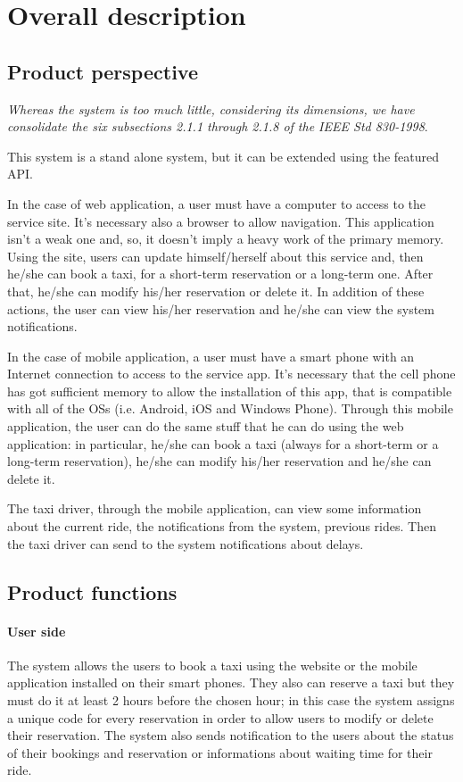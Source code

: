 \section{Overall description}
	\subsection{Product perspective}
		\emph{Whereas the system is too much little, considering its dimensions, we have consolidate the six subsections 2.1.1 through 2.1.8 of the IEEE Std 830-1998}.
		\vspace{10pt}
		
		This system is a stand alone system, but it can be extended using the featured API.
		
		In the case of web application, a user must have a computer to access to the service site. It's necessary also a browser to allow navigation. This application isn't a weak one and, so, it doesn't imply a heavy work of the primary memory. 
		Using the site, users can update himself/herself about this service and, then he/she can book a taxi, for a short-term reservation or a long-term one. After that, he/she can modify his/her reservation or delete it. In addition of these actions, the user can view his/her reservation and he/she can view the system notifications.
		
		In the case of mobile application, a user must have a smart phone with an Internet connection to access to the service app. It's necessary that the cell phone has got sufficient memory to allow the installation of this app, that is compatible with all of the OSs (i.e. Android, iOS and Windows Phone).
		Through this mobile application, the user can do the same stuff that he can do using the web application: in particular, he/she can book a taxi (always for a short-term or a long-term reservation), he/she can modify his/her reservation and he/she can delete it.
		
		The taxi driver, through the mobile application, can view some information about the current ride, the notifications from the system, previous rides. Then the taxi driver can send to the system notifications about delays.  
	\subsection{Product functions}
		\paragraph{User side}The system allows the users to book a taxi using the website or the mobile application installed on their smart phones. They also can reserve a taxi but they must do it at least 2 hours before the chosen hour; in this case the system assigns a unique code for every reservation in order to allow users to modify or delete their reservation. The system also sends notification to the users about the status of their bookings and reservation or informations about waiting time for their ride.
